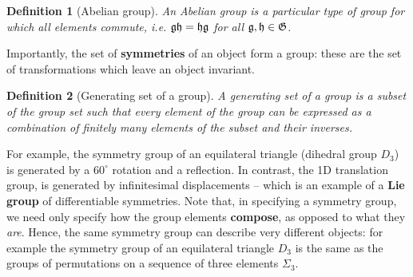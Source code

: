 \documentclass[11pt]{article}
\numberwithin{equation}{section}
\newtheorem{defn}{Definition}[section]
\begin{document}
\begin{defn}[Abelian group]
An Abelian group is a particular type of group for which all elements commute, i.e. $\mathfrak{gh} = \mathfrak{hg}$ for all $\mathfrak{g},\mathfrak{h} \in \mathfrak{G}$.
\end{defn}

Importantly, the set of \textbf{symmetries} of an object form a group: these are the set of transformations which leave an object invariant.

\begin{defn}[Generating set of a group]
A generating set of a group is a subset of the group set such that every element of the group can be expressed as a combination of finitely many elements of the subset and their inverses.
\end{defn}

For example, the symmetry group of an equilateral triangle (dihedral group $D_3$) is generated by a $60^{\circ}$ rotation and a reflection. In contrast, the 1D translation group, is generated by infinitesimal displacements -- which is an example of a \textbf{Lie group} of differentiable symmetries. Note that, in specifying a symmetry group, we need only specify how the group elements \textbf{compose}, as opposed to what they \textit{are}. Hence, the same symmetry group can describe very different objects: for example the symmetry group of an equilateral triangle $D_3$ is the same as the groups of permutations on a sequence of three elements $\Sigma_3$.
\end{document}
